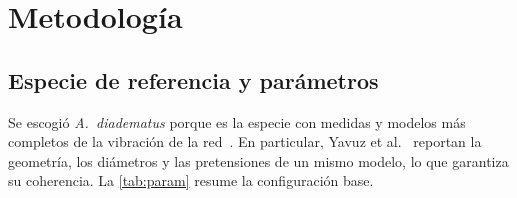 \documentclass[fleqn,final]{jaes}
\begin{document}
\section{Metodología}\label{sec:metodologia}

\subsection{Especie de referencia y parámetros}\label{sec:parametros}

Se escogió \textit{A.~diadematus} porque es la especie con medidas y
modelos más completos de la vibración de la
red~\cite{mortimer2016,mortimer2019decoding,yavuz2024}. En particular,
Yavuz et al.~\cite{yavuz2024} reportan la geometría, los diámetros y las
pretensiones de un mismo modelo, lo que garantiza su coherencia. La
\cref{tab:param} resume la configuración base.
\end{document}
